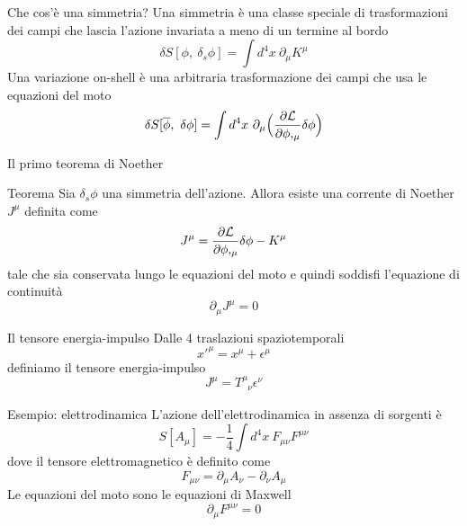 \begin{frame}{Che cos'è una simmetria?}
    Una simmetria è una classe speciale di trasformazioni dei campi che lascia l'azione invariata a meno di un termine al bordo
    \begin{equation*}
        \delta S[\phi, ~\delta_s \phi] = \int d^4 x ~ \partial_\mu K^\mu
    \end{equation*}
      Una variazione on-shell è una arbitraria trasformazione dei campi che usa le equazioni del moto
    \begin{equation*}
        \delta S[\overline \phi, ~\delta \phi] = \int d^4 x ~ \partial_\mu \Big ( \frac{\partial\mathcal L}{\partial\phi,_\mu}  \delta \phi \Big) 
    \end{equation*} 
\end{frame}

\begin{frame}{Il primo teorema di Noether}
    \begin{block}{Teorema}
        Sia $\delta_s \phi$ una simmetria dell'azione. Allora esiste una corrente di Noether $J^\mu$ definita come
        \begin{equation*}
            J^\mu = \frac{\partial\mathcal L}{\partial\phi,_\mu} \delta \phi - K^\mu
        \end{equation*}
            tale che sia conservata lungo le equazioni del moto e quindi soddisfi l'equazione di continuità
        \begin{equation*} 
            \partial_\mu J^\mu = 0
        \end{equation*}
    \end{block}
\end{frame}

\begin{frame}{Il tensore energia-impulso}
    Dalle 4 traslazioni spaziotemporali
    \begin{equation*}
        x'^\mu = x^\mu + \epsilon^\mu
    \end{equation*}
    definiamo il tensore energia-impulso
    \begin{equation*} 
        J^\mu = T^\mu_{\phantom \mu \nu} \epsilon^\nu
    \end{equation*}
\end{frame}

\begin{frame}{Esempio: elettrodinamica}
    L'azione dell'elettrodinamica in assenza di sorgenti è
    \begin{equation*}
        S[A_\mu] = - \frac{1}{4} \int d^4 x ~ F_{\mu\nu} F^{\mu\nu}
    \end{equation*}
    dove il tensore elettromagnetico è definito come 
    \begin{equation*}
        F_{\mu\nu} = \partial_\mu A_\nu - \partial_\nu A_\mu
    \end{equation*}
      Le equazioni del moto sono le equazioni di Maxwell
    \begin{equation*}
        \partial_\mu F^{\mu\nu} = 0
    \end{equation*}

\end{frame}

